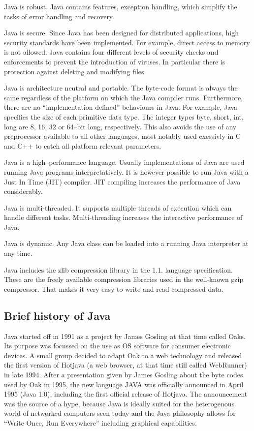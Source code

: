 Java is robust. Java contains features, exception handling, which simplify the
tasks of error handling and recovery.

Java is secure. Since Java has been designed for distributed applications, 
high security standards have been implemented. For example, direct access to
memory is not allowed. Java contains four different levels of security 
checks and enforcements to prevent the introduction of viruses. 
In particular there is protection against deleting and modifying files.

Java is architecture neutral and portable. The byte-code format is always the 
same regardless of the platform on which the Java compiler runs. Furthermore,
there are no ``implementation defined'' behaviours in Java. For example, Java
specifies the size of each primitive data type. The integer 
types byte, short, int, long are 8, 16, 32 or 64--bit long, respectively.
This also avoids the use of any preprocessor available to all other
languages, most notably used exessivly in C and C++ to catch all
platform relevant parameters.

Java is a high--performance language. 
Usually implementations of Java are used running 
Java programs interpretatively. It is however possible to run Java with a 
Just In Time (JIT) compiler. JIT compiling increases the performance of Java 
considerably.

Java is multi-threaded. It supports multiple threads of execution which can 
handle different tasks. Multi-threading increases the interactive performance 
of Java.

Java is dynamic. Any Java class can be loaded into a running Java interpreter 
at any time.

Java includes the zlib compression library in the 1.1. language specification.
These are
the freely available compression libraries used in the well-known
gzip compressor.
That makes it very easy to write and read compressed data. 


\subsection{Brief history of Java}
Java started off in 1991 as a project by James Gosling at that time called
Oaks. Its purpose was focussed on the use as OS software for consumer
electronic devices. A small group decided to adapt Oak to a web
technology and released the first version of Hotjava (a web browser, at that
time still called WebRunner)
in late 1994. After a presentation given by James Gosling about the 
byte codes used by Oak in 1995, the new language JAVA was officially 
announced in April 1995 (Java 1.0), 
including the first official release of Hotjava.
The announcement was the source of a hype, because Java is ideally
suited for the heterogenous world of networked computers seen today and
the Java philosophy allows for ``Write Once, Run Everywhere'' including
graphical capabilities.

